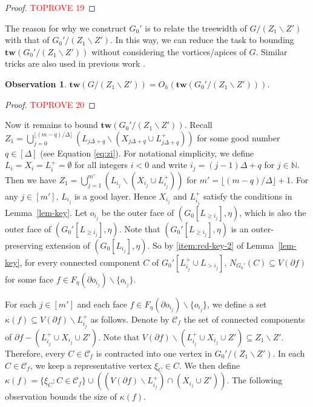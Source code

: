 \documentclass[a4paper,11pt]{article}
\numberwithin{lemma}{section}
\newtheorem{observation}[lemma]{Observation}
\newcommand{\tw}{\mathbf{tw}}
\begin{document}
\begin{proof}\textcolor{red}{TOPROVE 19}\end{proof}

The reason for why we construct $G_0'$ is to relate the treewidth of $G/(Z_1 \backslash Z')$ with that of $G_0'/(Z_1 \backslash Z')$.
In this way, we can reduce the task to bounding $\tw(G_0'/(Z_1 \backslash Z'))$ without considering the vortices/apices of $G$.
Similar tricks are also used in previous work \cite{BandyapadhyayLLSJ22,DemaineFHT05}.

\begin{observation}\label{obs-GtoG0'}
$\tw(G/(Z_1 \backslash Z')) = O_h(\tw(G_0'/(Z_1 \backslash Z')))$.
\end{observation}

\begin{proof}\textcolor{red}{TOPROVE 20}\end{proof}

Now it remains to bound $\tw(G_0'/(Z_1 \backslash Z'))$.
Recall $Z_1 = \bigcup_{j=0}^{\lfloor(m-q)/\Delta\rfloor} (L_{j\Delta+q} \backslash (X_{j\Delta+q} \cup L_{j\Delta+q}^+))$ for some good number $q \in [\Delta]$ (see Equation \eqref{eq:zi}).
For notational simplicity, we define $L_i = X_i = L_i^+ = \emptyset$ for all integers $i < 0$ and write $i_j = (j-1) \Delta + q$ for $j \in \mathbb{N}$.
Then we have $Z_1 = \bigcup_{j=1}^{m'} (L_{i_j} \backslash (X_{i_j} \cup L_{i_j}^+))$ for $m' = \lfloor (m-q)/\Delta \rfloor + 1$.
For any $j \in [m']$, $L_{i_j}$ is a good layer.
Hence $X_{i_j}$ and $L_{i_j}^+$ satisfy the conditions in Lemma~\ref{lem-key}.
Let $o_{i_j}$ be the outer face of $(G_0[L_{\geq i_j}],\eta)$, which is also the outer face of $(G_0'[L_{\geq i_j}],\eta)$.
Note that $(G_0'[L_{\geq i_j}],\eta)$ is an outer-preserving extension of $(G_0[L_{i_j}],\eta)$.
So by \ref{item:rcd-key-2} of Lemma~\ref{lem-key}, for every connected component $C$ of $G_0'[L_{i_j}^+ \cup L_{> i_j}]$, $N_{G_0'}(C) \subseteq V(\partial f)$ for some face $f \in F_\eta(\partial o_{i_j}) \backslash \{o_{i_j}\}$.

For each $j \in [m']$ and each face $f \in F_\eta(\partial o_{i_j}) \backslash \{o_{i_j}\}$, we define a set $\kappa(f) \subseteq V(\partial f) \backslash L_{i_j}^+$ as follows.
Denote by $\mathcal{C}_f$ the set of connected components of $\partial f - (L_{i_j}^+ \cup X_{i_j} \cup Z')$.
Note that $V(\partial f) \backslash (L_{i_j}^+ \cup X_{i_j} \cup Z') \subseteq Z_1 \backslash Z'$.
Therefore, every $C \in \mathcal{C}_f$ is contracted into one vertex in $G_0'/(Z_1 \backslash Z')$.
In each $C \in \mathcal{C}_f$, we keep a representative vertex $\xi_C \in C$.
We then define $\kappa(f) = \{\xi_C: C \in \mathcal{C}_f\} \cup ((V(\partial f) \backslash L_{i_j}^+) \cap (X_{i_j} \cup Z'))$.
The following observation bounds the size of $\kappa(f)$.
\end{document}
